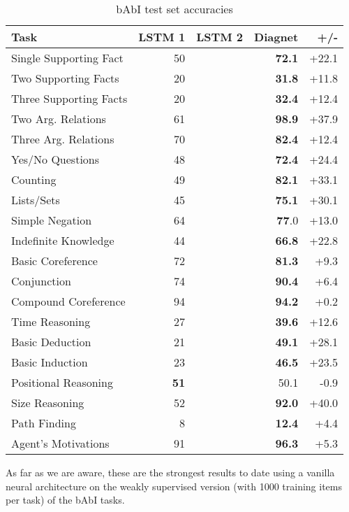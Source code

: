 \documentclass{article}
\begin{document}
\begin{table}[h]

\centering
\caption{bAbI test set accuracies}
\begin{tabular}{|l|r|r|r|r|}
\hline
Task & LSTM 1 & LSTM 2 & Diagnet & +/- \\
\hline
Single Supporting Fact & 50 &  & \textbf{72.1} & +22.1 \\
Two Supporting Facts & 20 &  &\textbf{31.8} & +11.8 \\
Three Supporting Facts & 20 &  & \textbf{32.4} & +12.4 \\
Two Arg. Relations & 61 &  & \textbf{98.9} & +37.9 \\
Three Arg. Relations & 70 & & \textbf{82.4} & +12.4 \\
Yes/No Questions & 48 & & \textbf{72.4} & +24.4 \\
Counting & 49 &  & \textbf{82.1} & +33.1 \\
Lists/Sets & 45 & & \textbf{75.1} & +30.1 \\
Simple Negation & 64 &  &\textbf{77}.0 & +13.0 \\
Indefinite Knowledge & 44 & & \textbf{66.8} & +22.8 \\
Basic Coreference & 72 &  & \textbf{81.3} & +9.3 \\
Conjunction & 74 &  & \textbf{90.4} & +6.4 \\
Compound Coreference & 94 &  & \textbf{94.2} & +0.2 \\
Time Reasoning & 27 &  & \textbf{39.6} & +12.6 \\
Basic Deduction & 21 &  & \textbf{49.1} & +28.1 \\
Basic Induction & 23 &  & \textbf{46.5} & +23.5 \\
Positional Reasoning &  \textbf{51} &  & 50.1 & -0.9 \\
Size Reasoning & 52 &  & \textbf{92.0} & +40.0 \\
Path Finding & 8 &  & \textbf{12.4} & +4.4 \\
Agent's Motivations & 91 &  & \textbf{96.3} & +5.3 \\
\hline

\end{tabular}

\end{table}

As far as we are aware, these are the strongest results to date using a vanilla neural architecture on the weakly supervised version (with 1000 training items per task) of the bAbI tasks.
\end{document}
